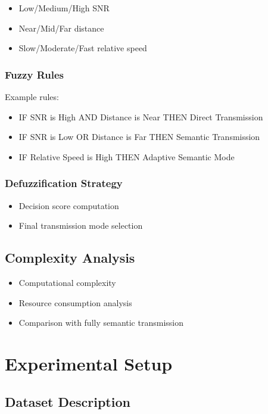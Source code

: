 \documentclass[lettersize,journal]{IEEEtran}
\begin{document}
\begin{itemize}
    \item Low/Medium/High SNR
    \item Near/Mid/Far distance
    \item Slow/Moderate/Fast relative speed
\end{itemize}

\subsubsection{Fuzzy Rules}

Example rules:
\begin{itemize}
    \item IF SNR is High AND Distance is Near THEN Direct Transmission
    \item IF SNR is Low OR Distance is Far THEN Semantic Transmission
    \item IF Relative Speed is High THEN Adaptive Semantic Mode
\end{itemize}

\subsubsection{Defuzzification Strategy}

\begin{itemize}
    \item Decision score computation
    \item Final transmission mode selection
\end{itemize}

\subsection{Complexity Analysis}

\begin{itemize}
    \item Computational complexity
    \item Resource consumption analysis
    \item Comparison with fully semantic transmission
\end{itemize}

\section{Experimental Setup}

\subsection{Dataset Description}
\end{document}
